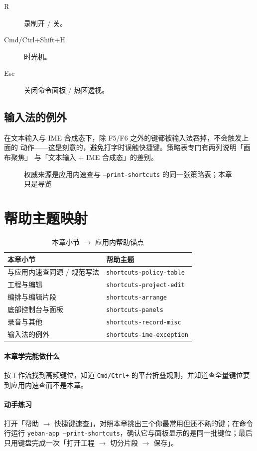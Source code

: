 \begin{description}
  \item[R] 录制开 / 关。
  \item[Cmd/Ctrl+Shift+H] 时光机。
  \item[Esc] 关闭命令面板 / 热区透视。
\end{description}

\subsection{输入法的例外}

在文本输入与 IME 合成态下，除 F5/F6 之外的键都被输入法吞掉，不会触发上面的
动作——这是刻意的，避免打字时误触快捷键。策略表专门有两列说明「画布聚焦」
与「文本输入 + IME 合成态」的差别。


\begin{figure}[htbp]
\centering
{}
\caption{权威来源是应用内速查与 \texttt{--print-shortcuts} 的同一张策略表；本章只是导览}
\label{fig:ch09-shortcut-source}
\end{figure}

\section{帮助主题映射}

\begin{table}[htbp]
\centering
\caption{本章小节 $\to$ 应用内帮助锚点}
\label{tab:ch09-help}
\begin{tabular}{ll}
\hline
本章小节 & 帮助主题 \\
\hline
与应用内速查同源 / 规范写法 & \texttt{shortcuts-policy-table} \\
工程与编辑 & \texttt{shortcuts-project-edit} \\
编排与编辑片段 & \texttt{shortcuts-arrange} \\
底部控制台与面板 & \texttt{shortcuts-panels} \\
录音与其他 & \texttt{shortcuts-record-misc} \\
输入法的例外 & \texttt{shortcuts-ime-exception} \\
\hline
\end{tabular}
\end{table}

\paragraph{本章学完能做什么} 按工作流找到高频键位，知道 \texttt{Cmd/Ctrl+} 的平台折叠规则，并知道查全量键位要到应用内速查而不是本章。

\paragraph{动手练习} 打开「帮助 $\to$ 快捷键速查」，对照本章挑出三个你最常用但还不熟的键；在命令行运行 \texttt{yeban-app --print-shortcuts}，确认它与面板显示的是同一批键位；最后只用键盘完成一次「打开工程 $\to$ 切分片段 $\to$ 保存」。
